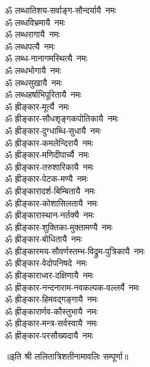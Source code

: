 \begin{multicols}{2}
\begin{flushleft}
ॐ लब्धातिशय-सर्वाङ्ग-सौन्दर्यायै~नमः\\
ॐ लब्धविभ्रमायै~नमः\\
ॐ लब्धरागायै~नमः\\
ॐ लब्धपत्यै~नमः\\
ॐ लब्ध-नानागमस्थित्यै~नमः\\
ॐ लब्धभोगायै~नमः\\
ॐ लब्धसुखायै~नमः\\
ॐ लब्धहर्षाभिपूरितायै~नमः\hfill {}\\
ॐ ह्रीङ्कार-मूर्त्यै~नमः\\
ॐ ह्रीङ्कार-सौधशृङ्गकपोतिकायै~नमः\\
ॐ ह्रीङ्कार-दुग्धाब्धि-सुधायै~नमः\\
ॐ ह्रीङ्कार-कमलेन्दिरायै~नमः\\
ॐ ह्रीङ्कार-मणिदीपार्च्यै~नमः\\
ॐ ह्रीङ्कार-तरुशारिकायै~नमः\\
ॐ ह्रीङ्कार-पेटक-मण्यै~नमः\\
ॐ ह्रीङ्कारादर्श-बिम्बितायै~नमः\\
ॐ ह्रीङ्कार-कोशासिलतायै~नमः\\
ॐ ह्रीङ्कारास्थान-नर्तक्यै~नमः\hfill {}\\
ॐ ह्रीङ्कार-शुक्तिका-मुक्तामण्यै~नमः\\
ॐ ह्रीङ्कार-बोधितायै~नमः\\
ॐ ह्रीङ्कारमय-सौवर्णस्तम्भ-विद्रुम-पुत्रिकायै~नमः\\
ॐ ह्रीङ्कार-वेदोपनिषदे~नमः\\
ॐ ह्रीङ्काराध्वर-दक्षिणायै~नमः\\
ॐ ह्रीङ्कार-नन्दनाराम-नवकल्पक-वल्लर्यै~नमः\\
ॐ ह्रीङ्कार-हिमवद्गङ्गायै~नमः\\
ॐ ह्रीङ्कारार्णव-कौस्तुभायै~नमः\\
ॐ ह्रीङ्कार-मन्त्र-सर्वस्वायै~नमः\\
ॐ ह्रीङ्कार-परसौख्यदायै~नमः\hfill {}\\
\end{flushleft}
\end{multicols}
\centerline{॥इति श्री ललितात्रिशतीनामावलिः सम्पूर्णा॥}
